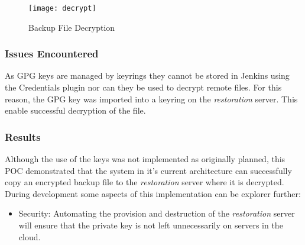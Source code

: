 	\begin{figure}[H]
		\caption{Backup File Decryption}
		\centering
		\texttt{[image: decrypt]}
		\label{fig:decrypt}
	\end{figure}
	
	\subsubsection{Issues Encountered}
	As GPG keys are managed by keyrings they cannot be stored in Jenkins using the Credentials plugin nor can they be used to decrypt remote files. For this reason, the GPG key was imported into a keyring on the \textit{restoration} server. This enable  successful decryption of the file.
	
	\subsubsection{Results}
	Although the use of the keys was not implemented as originally planned, this POC demonstrated that the system in it's current architecture can successfully copy an encrypted backup file to the \textit{restoration} server where it is decrypted. During development some aspects of this implementation can be explorer further:
	\begin{itemize}
		\item Security: Automating the provision and destruction of the \textit{restoration} server will ensure that the private key is not left unnecessarily on servers in the cloud. 
	\end{itemize}
	